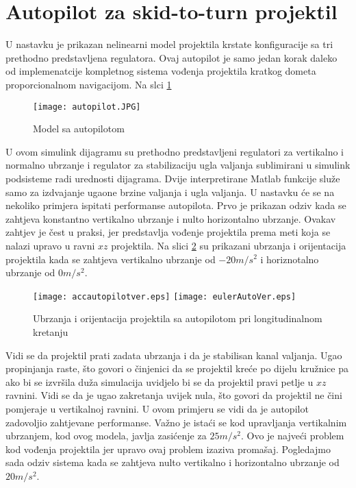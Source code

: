 \section{Autopilot za skid-to-turn projektil}
U nastavku je prikazan nelinearni model projektila krstate konfiguracije sa tri 
prethodno predstavljena regulatora. Ovaj autopilot je samo jedan korak daleko od
implemenatcije kompletnog sistema vođenja projektila kratkog dometa proporcionalnom
navigacijom. Na slci \ref{fig:autopilot3}
\begin{figure}[!ht]
    \centering
    \texttt{[image: autopilot.JPG]}
    \caption{Model sa autopilotom}
    \label{fig:autopilot3}
\end{figure}
U ovom simulink dijagramu su prethodno predstavljeni regulatori za vertikalno i normalno ubrzanje i 
regulator za stabilizaciju ugla valjanja sublimirani u simulink podsisteme radi 
urednosti dijagrama. Dvije interpretirane Matlab funkcije služe samo za izdvajanje ugaone brzine valjanja
i ugla valjanja. U nastavku će se na nekoliko primjera ispitati performanse 
autopilota. Prvo je prikazan odziv kada se zahtjeva konstantno vertikalno ubrzanje i nulto 
horizontalno ubrzanje. Ovakav zahtjev je čest u praksi, jer predstavlja vođenje projektila 
prema meti koja se nalazi upravo u ravni $xz$ projektila. Na slici \ref{fig:accautover} su prikazani 
ubrzanja i orijentacija projektila kada se zahtjeva vertikalno ubrzanje od $-20 m/s^2$ i horiznotalno ubrzanje od 
$0m/s^2$.
\begin{figure}[!ht]
    \centering
    \texttt{[image: accautopilotver.eps]}
    \texttt{[image: eulerAutoVer.eps]}
    \caption{Ubrzanja i orijentacija projektila sa autopilotom pri longitudinalnom kretanju}
    \label{fig:accautover}
\end{figure}
Vidi se da projektil prati zadata ubrzanja i da je stabilisan kanal valjanja. Ugao propinjanja raste, 
što govori o činjenici da se projektil kreće po dijelu kružnice pa ako bi se izvršila duža simulacija 
uvidjelo bi se da projektil pravi petlje u $xz$ ravnini. Vidi se da je ugao zakretanja 
uvijek nula, što govori da projektil ne čini pomjeraje u vertikalnoj ravnini. U ovom primjeru se 
vidi da je autopilot zadovoljio zahtjevane performanse. Važno je istaći se kod upravljanja vertikalnim 
ubrzanjem, kod ovog modela, javlja zasićenje za $25m/s^2$. Ovo je najveći problem 
kod vođenja projektila jer upravo ovaj problem izaziva promašaj. 
Pogledajmo sada odziv sistema kada se zahtjeva nulto vertikalno i horizontalno ubrzanje od $20m/s^2$. 
